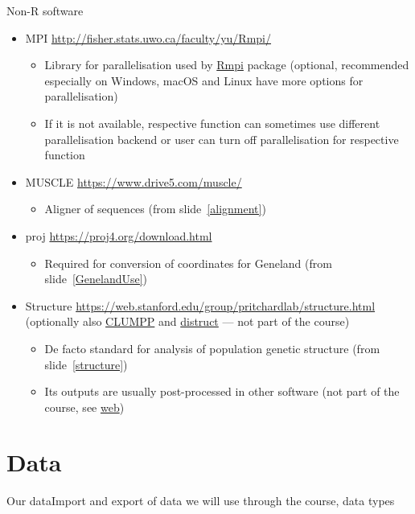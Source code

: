 \documentclass[compress, ucs, xelatex, 11pt, xcolor=svgnames, aspectratio=169,
	hyperref={
		bookmarks=true,
		unicode=true,
		colorlinks=true,
		pdftitle={Molecular data in R},
		plainpages=false,
		pdfauthor={Vojtech Zeisek},
		pdfsubject={Course about phylogeny and evolution in R},
		pdfcreator={XeLaTeX},
		pdfkeywords={R, evolution, phylogeny, molecular data},
		linkcolor=Crimson, %
		anchorcolor=Magenta, %
		citecolor=Magenta, %
		filecolor=Magenta, %
		menucolor=Magenta, %
		urlcolor=DodgerBlue, %
		pdftex},
	url={hyphens, lowtilde} %
	]{beamer}
\begin{document}
\begin{frame}[allowframebreaks]{Non-R software}
\begin{itemize}
\begin{itemize}
		\end{itemize}
		\item MPI \url{http://fisher.stats.uwo.ca/faculty/yu/Rmpi/}
		\begin{itemize}
			\item Library for parallelisation used by \href{https://CRAN.R-project.org/package=Rmpi}{Rmpi} package (optional, recommended especially on Windows, macOS and Linux have more options for parallelisation)
			\item If it is not available, respective function can sometimes use different parallelisation backend or user can turn off parallelisation for respective function
		\end{itemize}
		\item MUSCLE \url{https://www.drive5.com/muscle/}
		\begin{itemize}
			\item Aligner of sequences (from slide~\ref{alignment})
		\end{itemize}
		\item proj \url{https://proj4.org/download.html}
		\begin{itemize}
			\item Required for conversion of coordinates for Geneland (from slide~\ref{GenelandUse})
		\end{itemize}
		\item Structure \url{https://web.stanford.edu/group/pritchardlab/structure.html} (optionally also \href{https://web.stanford.edu/group/rosenberglab/clumpp.html}{CLUMPP} and \href{https://web.stanford.edu/group/rosenberglab/distruct.html}{distruct} --- not part of the course)
		\begin{itemize}
			\item De facto standard for analysis of population genetic structure (from slide~\ref{structure})
			\item Its outputs are usually post-processed in other software (not part of the course, see \href{https://trapa.cz/en/structure-r-linux}{web})
		\end{itemize}
	\end{itemize}
\end{frame}

\section{Data}

\begin{frame}{Our data}{Import and export of data we will use through the course, data types}
	\tableofcontents[currentsection, sectionstyle=show/hide, hideothersubsections]
\end{frame}
\end{document}
